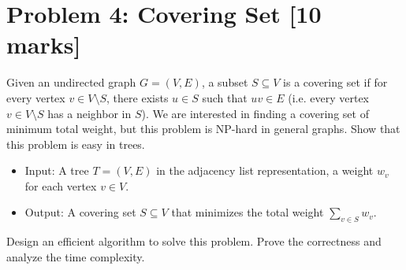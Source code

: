\documentclass[11pt,twoside]{article}
\newcommand{\problem}[1]{\section*{Problem #1}}
\begin{document}
\problem{4: Covering Set [10 marks]}
Given an undirected graph $G = (V,E)$, a subset $S\subseteq V$ is a covering set if for every vertex $v\in V\setminus S$,
there exists $u\in S$ such that $uv\in E$ (i.e. every vertex $v\in V\setminus S$ has a neighbor in $S$). We are interested in finding a covering set of minimum total weight, but this problem is NP-hard in general graphs. Show that this problem is easy in trees.
\begin{itemize}
	\item Input: A tree $T = (V, E)$ in the adjacency list representation, a weight $w_v$ for each vertex $v\in V$.
	\item Output: A covering set $S\subseteq V$ that minimizes the total weight $\sum_{v\in S} w_{v}$.
\end{itemize}
Design an efficient algorithm to solve this problem. Prove the correctness and analyze the time complexity.
\end{document}
